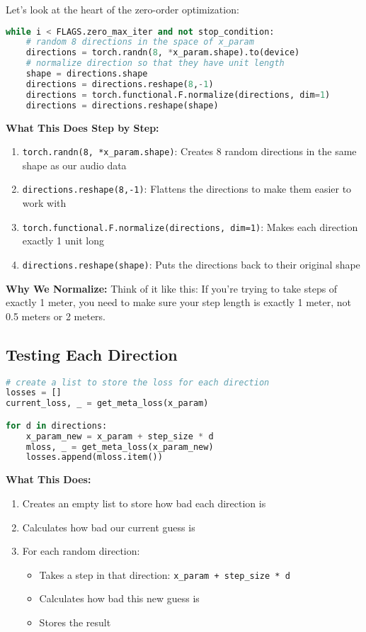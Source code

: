 \documentclass[12pt]{article}
\begin{document}
Let's look at the heart of the zero-order optimization:

\begin{lstlisting}[language=Python, basicstyle=\small]
while i < FLAGS.zero_max_iter and not stop_condition:
    # random 8 directions in the space of x_param
    directions = torch.randn(8, *x_param.shape).to(device)
    # normalize direction so that they have unit length
    shape = directions.shape
    directions = directions.reshape(8,-1)
    directions = torch.functional.F.normalize(directions, dim=1)
    directions = directions.reshape(shape)
\end{lstlisting}

\textbf{What This Does Step by Step:}
\begin{enumerate}
    \item \texttt{torch.randn(8, *x\_param.shape)}: Creates 8 random directions in the same shape as our audio data
    \item \texttt{directions.reshape(8,-1)}: Flattens the directions to make them easier to work with
    \item \texttt{torch.functional.F.normalize(directions, dim=1)}: Makes each direction exactly 1 unit long
    \item \texttt{directions.reshape(shape)}: Puts the directions back to their original shape
\end{enumerate}

\textbf{Why We Normalize:}
Think of it like this: If you're trying to take steps of exactly 1 meter, you need to make sure your step length is exactly 1 meter, not 0.5 meters or 2 meters.

\subsection{Testing Each Direction}

\begin{lstlisting}[language=Python, basicstyle=\small]
# create a list to store the loss for each direction
losses = []
current_loss, _ = get_meta_loss(x_param)

for d in directions:
    x_param_new = x_param + step_size * d
    mloss, _ = get_meta_loss(x_param_new)
    losses.append(mloss.item())
\end{lstlisting}

\textbf{What This Does:}
\begin{enumerate}
    \item Creates an empty list to store how bad each direction is
    \item Calculates how bad our current guess is
    \item For each random direction:
    \begin{itemize}
        \item Takes a step in that direction: \texttt{x\_param + step\_size * d}
        \item Calculates how bad this new guess is
        \item Stores the result
    \end{itemize}
\end{enumerate}
\end{document}
